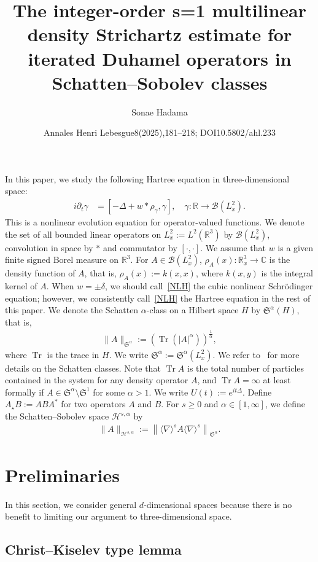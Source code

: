 \documentclass[10pt]{amsart}
\title[Integer-order multilinear density estimates]{The integer-order s=1 multilinear density Strichartz estimate for iterated Duhamel operators in Schatten--Sobolev classes}
\author{Sonae Hadama}
\date{Annales Henri Lebesgue8(2025),181–218; DOI10.5802/ahl.233}
\theoremstyle{definition}
\numberwithin{equation}{section}
\newcommand{\BC}{\mathbb{C}}
\newcommand{\BR}{\mathbb{R}}
\newcommand{\CB}{\mathcal{B}}
\newcommand{\CH}{\mathcal{H}}
\newcommand{\FS}{\mathfrak{S}}
\newcommand{\al}{\alpha}
\newcommand{\ga}{\gamma}
\newcommand{\de}{\delta}
\newcommand{\rh}{\rho}
\newcommand{\De}{\Delta}
\newcommand{\pl}{\partial}
\newcommand{\K}[1]{\left(#1\right)}
\newcommand{\I}{\infty}
\DeclareMathOperator{\Tr}{Tr}
\newcommand{\sd}{\langle \nabla \rangle}
\newcommand{\Sa}{{\FS^\al}}
\newcommand{\st}{\star}
\begin{document}
\maketitle
In this paper, we study the following Hartree equation in three-dimensional space:
\begin{align}\label{NLH}
\tag{NLH} 
i \pl_t \ga &= [- \Delta + w \ast \rho_\ga, \ga], \quad \ga:\BR \to \CB(L^2_x).
\end{align}
This is a nonlinear evolution equation for operator-valued functions. We denote the set of all bounded linear operators on $L^2_x := L^2(\BR^3)$ by $\CB(L^2_x)$, convolution in space by $\ast$ and commutator by $[\cdot, \cdot]$. We assume that $w$ is a given finite signed Borel measure on $\BR^3$. For $A \in \CB(L^2_x)$, $\rh_A(x) : \BR^3_x \to \BC$ is the density function of $A$, that is, $\rh_A(x):=k(x,x)$, where $k(x,y)$ is the integral kernel of $A$. When $w = \pm \de$, we should call~\eqref{NLH} the cubic nonlinear Schr\"odinger equation; however, we consistently call~\eqref{NLH} the Hartree equation in the rest of this paper.
We denote the Schatten $\al$-class on a Hilbert space $H$ by $\FS^\al(H)$, that is,
\begin{align}
\|A\|_{\FS^\al}:= \K{\Tr(|A|^\al) }^{\frac{1}{\al}},
\end{align}
where $\Tr$ is the trace in $H$. We write $\FS^\al:=\FS^\al(L^2_x)$. We refer to~\cite{2005Simon} for more details on the Schatten classes. Note that $\Tr A$ is the total number of particles contained in the system for any density operator $A$, and $\Tr A = \I$ at least formally if $A \in \FS^\al \setminus \FS^1$ for some $\al >1$.
We write $U(t):=e^{it\De}$. Define $A_\st B := A B A^*$ for two operators $A$ and $B$. For $s \ge 0$ and $\al \in [1,\I]$, we define the Schatten--Sobolev space $\CH^{s,\al}$ by
\begin{align}
\|A\|_{\CH^{s,\al}} := \left\|\sd^s A \sd^s\right\|_\Sa.
\end{align}
\setcounter{section}{2}
\section{Preliminaries}\label{sect3}

In this section, we consider general $d$-dimensional spaces because there is no benefit to limiting our argument to three-dimensional space.

\subsection{Christ--Kiselev type lemma} 
\end{document}
